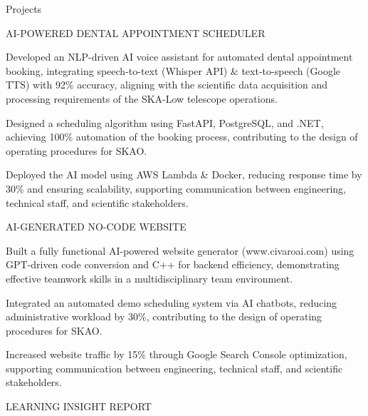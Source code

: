 \documentclass{resume} %
\begin{document}
    \begin{rSection}{Projects}
                    \begin{rSubsection}
                                    {AI{-}POWERED DENTAL APPOINTMENT SCHEDULER}
                                {}{}{}
                                    \item Developed an NLP{-}driven AI voice assistant for automated dental appointment booking, integrating speech{-}to{-}text (Whisper API) \& text{-}to{-}speech (Google TTS) with 92\% accuracy, aligning with the scientific data acquisition and processing requirements of the SKA{-}Low telescope operations.
                                    \item Designed a scheduling algorithm using FastAPI, PostgreSQL, and .NET, achieving 100\% automation of the booking process, contributing to the design of operating procedures for SKAO.
                                    \item Deployed the AI model using AWS Lambda \& Docker, reducing response time by 30\% and ensuring scalability, supporting communication between engineering, technical staff, and scientific stakeholders.
                            \end{rSubsection}
                    \begin{rSubsection}
                                    {AI{-}GENERATED NO{-}CODE WEBSITE}
                                {}{}{}
                                    \item Built a fully functional AI{-}powered website generator (www.civaroai.com) using GPT{-}driven code conversion and C++ for backend efficiency, demonstrating effective teamwork skills in a multidisciplinary team environment.
                                    \item Integrated an automated demo scheduling system via AI chatbots, reducing administrative workload by 30\%, contributing to the design of operating procedures for SKAO.
                                    \item Increased website traffic by 15\% through Google Search Console optimization, supporting communication between engineering, technical staff, and scientific stakeholders.
                            \end{rSubsection}
                    \begin{rSubsection}
                                    {LEARNING INSIGHT REPORT}
                                {}{}{}

\end{rSubsection}
\end{rSection}
\end{document}
